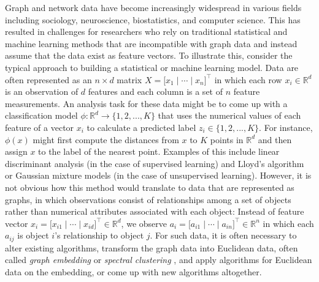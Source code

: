\documentclass[
  12pt,
]{article}
\theoremstyle{definition}
\theoremstyle{definition}
\theoremstyle{definition}
\theoremstyle{definition}
\theoremstyle{remark}
\begin{document}
Graph and network data have become increasingly widespread in various fields including sociology, neuroscience, biostatistics, and computer science.
This has resulted in challenges for researchers who rely on traditional statistical and machine learning methods that are incompatible with graph data and instead assume that the data exist as feature vectors.
To illustrate this, consider the typical approach to building a statistical or machine learning model.
Data are often represented as an \(n \times d\) matrix \(X = \Big[ x_1 \mid \cdots \mid x_n \Big]^\top\) in which each row \(x_i \in \mathbb{R}^d\) is an observation of \(d\) features and each column is a set of \(n\) feature measurements.
An analysis task for these data might be to come up with a classification model \(\phi : \mathbb{R}^d \to \{1, 2, ..., K\}\) that uses the numerical values of each feature of a vector \(x_i\) to calculate a predicted label \(z_i \in \{1, 2, ..., K\}\).
For instance, \(\phi(x)\) might first compute the distances from \(x\) to \(K\) points in \(\mathbb{R}^d\) and then assign \(x\) to the label of the nearest point.
Examples of this include linear discriminant analysis (in the case of supervised learning) and Lloyd's algorithm \citep{1056489} or Gaussian mixture models \citep{doi:10.1198/016214502760047131} (in the case of unsupervised learning).
However, it is not obvious how this method would translate to data that are represented as graphs, in which observations consist of relationships among a set of objects rather than numerical attributes associated with each object:
Instead of feature vector \(x_i = \Big[ x_{i1} \mid \cdots \mid x_{id} \Big]^\top \in \mathbb{R}^d\), we observe \(a_i = \Big[ a_{i1} \mid \cdots \mid a_{in} \Big]^\top \in \mathbb{R}^n\) in which each \(a_{ij}\) is object \(i\)'s relationship to object \(j\).
For such data, it is often necessary to alter existing algorithms, transform the graph data into Euclidean data, often called \emph{graph embedding} or \emph{spectral clustering} \citep{vonLuxburg2007}, and apply algorithms for Euclidean data on the embedding, or come up with new algorithms altogether.
\end{document}

